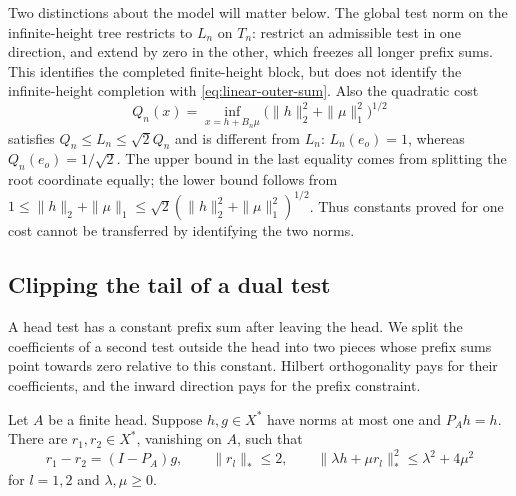 Two distinctions about the model will matter below.  The global test
norm on the infinite-height tree restricts to $L_n$ on $T_n$: restrict
an admissible test in one direction, and extend by zero in the other,
which freezes all longer prefix sums.  This identifies the completed
finite-height block, but does not identify the infinite-height
completion with \eqref{eq:linear-outer-sum}.  Also the quadratic cost
\[
 Q_n(x)=\inf_{x=h+B_n\mu}
           \bigl(\|h\|_2^2+\|\mu\|_1^2\bigr)^{1/2}
\]
satisfies $Q_n\le L_n\le\sqrt2Q_n$ and is different from $L_n$:
$L_n(e_o)=1$, whereas $Q_n(e_o)=1/\sqrt2$.  The upper bound in the
last equality comes from splitting the root coordinate equally; the
lower bound follows from
$1\le\|h\|_2+\|\mu\|_1\le\sqrt2(\|h\|_2^2+\|\mu\|_1^2)^{1/2}$.
Thus constants proved for one cost cannot be transferred by identifying
the two norms.

\subsection{Clipping the tail of a dual test}
\label{subsec:linear-clipping}

A head test has a constant prefix sum after leaving the head. We split
the coefficients of a second test outside the head into two pieces whose prefix sums point towards zero
relative to this constant.  Hilbert orthogonality pays for their
coefficients, and the inward direction pays for the prefix constraint.

\begin{lemma}
\label{lem:linear-inward}
Let $A$ be a finite head.  Suppose $h,g\in X^*$ have norms at most one
and $P_Ah=h$.  There are $r_1,r_2\in X^*$, vanishing on $A$, such that
\[
 r_1-r_2=(I-P_A)g,\qquad \|r_l\|_*\le2,
 \qquad
 \|\lambda h+\mu r_l\|_*^2\le\lambda^2+4\mu^2
\]
for $l=1,2$ and $\lambda,\mu\ge0$.
\end{lemma}

